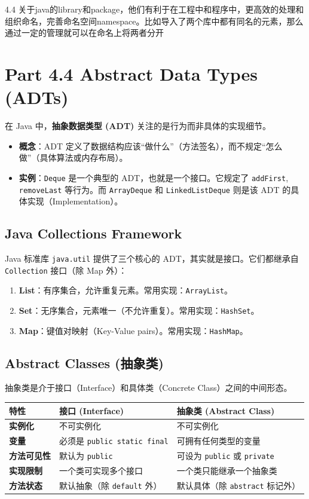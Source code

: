 \documentclass[12pt, a4paper, openany]{ctexbook} %
\begin{document}
\par
4.4 关于java的library和package，他们有利于在工程中和程序中，更高效的处理和组织命名，完善命名空间namespace。比如导入了两个库中都有同名的元素，那么通过一定的管理就可以在命名上将两者分开
\par


\section{Part 4.4 Abstract Data Types (ADTs)}
在 Java 中，\textbf{抽象数据类型 (ADT)} 关注的是行为而非具体的实现细节。
\begin{itemize}
    \item \textbf{概念}：ADT 定义了数据结构应该“做什么”（方法签名），而不规定“怎么做”（具体算法或内存布局）。
    \item \textbf{实例}：\texttt{Deque} 是一个典型的 ADT，也就是一个接口。它规定了 \texttt{addFirst}, \texttt{removeLast} 等行为。而 \texttt{ArrayDeque} 和 \texttt{LinkedListDeque} 则是该 ADT 的具体实现（Implementation）。
\end{itemize}

\subsection{Java Collections Framework}
Java 标准库 \texttt{java.util} 提供了三个核心的 ADT，其实就是接口。它们都继承自 \texttt{Collection} 接口（除 Map 外）：

\begin{enumerate}
    \item \textbf{List}：有序集合，允许重复元素。常用实现：\texttt{ArrayList}。
    \item \textbf{Set}：无序集合，元素唯一（不允许重复）。常用实现：\texttt{HashSet}。
    \item \textbf{Map}：键值对映射（Key-Value pairs）。常用实现：\texttt{HashMap}。
\end{enumerate}

\subsection{Abstract Classes (抽象类)}
抽象类是介于接口（Interface）和具体类（Concrete Class）之间的中间形态。

\begin{table}[h]
\centering
\begin{tabular}{@{}lll@{}}
\toprule
\textbf{特性} & \textbf{接口 (Interface)} & \textbf{抽象类 (Abstract Class)} \\ \midrule
\textbf{实例化} & 不可实例化 & 不可实例化 \\
\textbf{变量} & 必须是 \texttt{public static final} & 可拥有任何类型的变量 \\
\textbf{方法可见性} & 默认为 \texttt{public} & 可设为 \texttt{public} 或 \texttt{private} \\
\textbf{实现限制} & 一个类可实现多个接口 & 一个类只能继承一个抽象类 \\
\textbf{方法状态} & 默认抽象（除 \texttt{default} 外） & 默认具体（除 \texttt{abstract} 标记外） \\ \bottomrule
\end{tabular}
\end{table}
\end{document}

